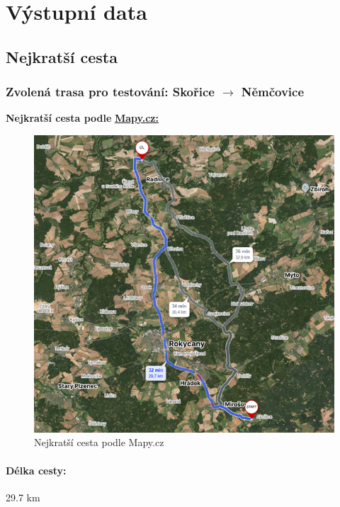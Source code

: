 \section{Výstupní data}

\subsection{Nejkratší cesta}

\subsubsection{Zvolená trasa pro testování: Skořice \texorpdfstring{\(\rightarrow\)}{->} Němčovice}
\textbf{Nejkratší cesta podle} \href{https://mapy.cz/letecka?planovani-trasy&rc=9ezy9xVfEq9efLtxWmgn&rs=muni&rs=muni&ri=58&ri=2029&mrp=%7B%22c%22%3A111%7D&xc=%5B%5D&rwp=1%3B9ew5DxVgNta6jmurcf.jsIc..jMqfITmr-eIZmXQSnxW6EjfHQxW-1g3i-xWg5N&rut=1&x=13.6007336&y=49.7887247&z=11}{\textbf{Mapy.cz:}}
\newpage
\begin{figure}[H]
    \centering
    \includegraphics[width=\textwidth]{images/Shortest_path_mapy_cz.png}
    \caption{Nejkratší cesta podle Mapy.cz}
\end{figure}
\paragraph{Délka cesty:} 29.7 km

